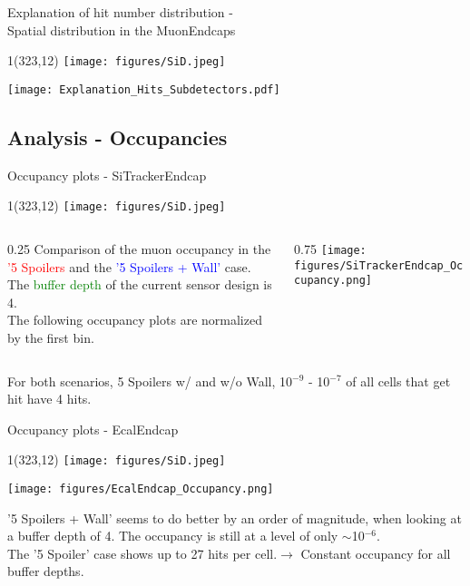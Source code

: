 \documentclass[xcolor={dvipsnames}]{beamer}
\newcommand{\sidlogo}{
  \setlength{\TPHorizModule}{1pt}
  \setlength{\TPVertModule}{1pt}
  \begin{textblock}{1}(323,12)
   \texttt{[image: figures/SiD.jpeg]}
  \end{textblock}
  }
\begin{document}
\begin{frame}{Explanation of hit number distribution -\\ \small Spatial distribution in the MuonEndcaps}
\sidlogo
 \begin{center}
\texttt{[image: Explanation\_Hits\_Subdetectors.pdf]}
\end{center}
\end{frame}

\subsection{Analysis - Occupancies}
\begin{frame}{Occupancy plots - \small SiTrackerEndcap}
\sidlogo
\begin{columns}
 \begin{column}{0.25\textwidth}
 \small
  Comparison of the muon occupancy in the \textcolor{red}{'5 Spoilers} and the \textcolor{blue}{'5 Spoilers + Wall'} case.\\{\small The \textcolor{green}{buffer depth} of the current sensor design is 4.}\\
  \vspace*{0.2cm}
  {\footnotesize The following occupancy plots are normalized by the first bin.}
 \end{column}
 \begin{column}{0.75\textwidth}
\texttt{[image: figures/SiTrackerEndcap\_Occupancy.png]}
\end{column}
\end{columns}
For both scenarios, 5 Spoilers w/ and w/o Wall, 10$^{-9}$ - 10$^{-7}$ of all cells that get hit have 4 hits.
\end{frame}
\begin{frame}{Occupancy plots - \small EcalEndcap}
\sidlogo
 \begin{center}
\texttt{[image: figures/EcalEndcap\_Occupancy.png]}
\end{center}
\small '5 Spoilers + Wall' seems to do better by an order of magnitude, when looking at a buffer depth of 4. The occupancy is still at a level of only $\sim$10$^{-6}$.\\
\small The '5 Spoiler' case shows up to 27 hits per cell.$\rightarrow$ Constant occupancy for all buffer depths.
\end{frame}
\end{document}
